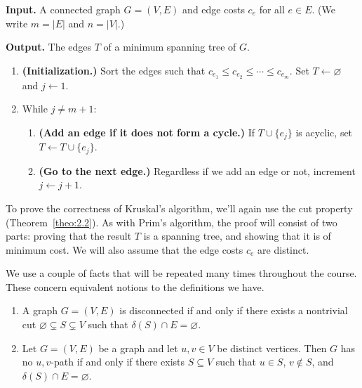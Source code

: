 \begin{mdframed}[
    linewidth=1pt,
    linecolor=black,
    bottomline=false,topline=false,rightline=false,
    innerrightmargin=0pt,innertopmargin=0pt,innerbottommargin=0pt,
    innerleftmargin=1em,%
    skipabove=0.75\baselineskip
]
{\bf Input.} A connected graph $G = (V, E)$ and edge costs $c_e$ for 
all $e \in E$. (We write $m = |E|$ and $n = |V|$.)

{\bf Output.} The edges $T$ of a minimum spanning tree of $G$.
\begin{enumerate}[leftmargin=1.75cm, label={Step \arabic*.}]
    \item {\bf (Initialization.)} Sort the edges such that 
    $c_{e_1} \leq c_{e_2} \leq \cdots \leq c_{e_m}$. 
    Set $T \gets \varnothing$ and $j \gets 1$. 

    \item While $j \neq m+1$:
    \begin{enumerate}[label={}]
        \item {\bf (Add an edge if it does not form a cycle.)} 
        If $T \cup \{e_j\}$ is acyclic, set $T \gets T \cup \{e_j\}$. 
        \item {\bf (Go to the next edge.)} Regardless if we add an edge or not, 
        increment $j \gets j+1$. 
    \end{enumerate}
\end{enumerate}
\end{mdframed}\vspace{-0.15cm}

To prove the correctness of Kruskal's algorithm, we'll again use the cut 
property (Theorem~\ref{theo:2.2}). As with Prim's algorithm, the proof will 
consist of two parts: proving that the result $T$ is a spanning tree, and showing 
that it is of minimum cost. We will also assume that the edge costs $c_e$ are 
distinct. 

We use a couple of facts that will be repeated 
many times throughout the course. These concern equivalent 
notions to the definitions we have.
\begin{enumerate}[(1)]
    \item A graph $G = (V, E)$ is disconnected if and only if there exists a 
    nontrivial cut $\varnothing \subsetneq S \subsetneq V$ such that 
    $\delta(S) \cap E = \varnothing$. 
    \item Let $G = (V, E)$ be a graph and let $u, v \in V$ be distinct vertices. 
    Then $G$ has no $u, v$-path if and only if there exists $S \subseteq V$ 
    such that $u \in S$, $v \notin S$, and $\delta(S) \cap E = \varnothing$. 
\end{enumerate}

